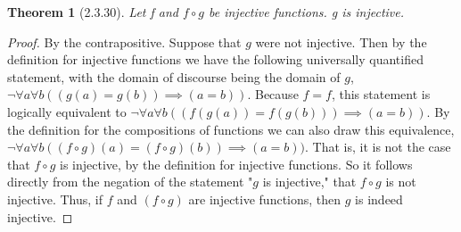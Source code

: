 \documentclass[a4paper, 12pt]{article}
\theoremstyle{plain}
\newtheorem*{theorem*}{Theorem}
\begin{document}
	
	\begin{theorem*}[2.3.30]
		Let f and $f \circ g$ be injective functions. g is injective.
	\end{theorem*}
	
	\begin{proof}
		By the contrapositive. Suppose that $g$ were not injective. Then by the definition for injective functions we have the following universally quantified statement, with the domain of discourse being the domain of $g$, \newline $\lnot \forall a \forall b ((g(a) = g(b)) \implies (a = b))$. Because $f = f$, this statement is logically equivalent to $\lnot \forall a \forall b ((f(g(a)) = f(g(b))) \implies (a = b))$. By the \newline definition for the compositions of functions we can also draw this equivalence, $\lnot \forall a \forall b ((f \circ g)(a) = (f \circ g)(b)) \implies (a = b))$. That is, it is not the case that $f \circ g$ is injective, by the definition for injective functions. So it follows directly from the negation of the statement "$g$ is injective," that $f \circ g$ is not injective. Thus, if $f$ and $(f \circ g)$ are injective functions, then $g$ is indeed injective.
	\end{proof}
\end{document}
